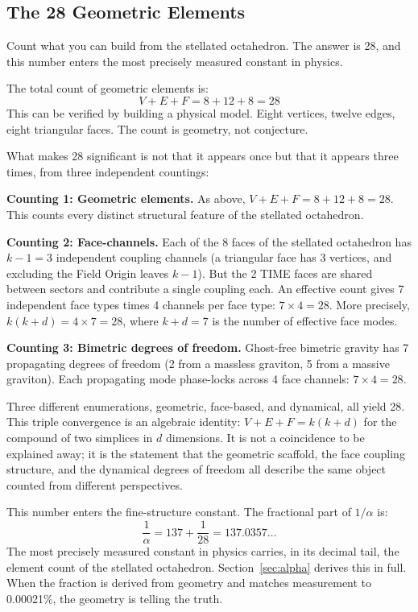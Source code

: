 \documentclass[aps,prd,preprint,superscriptaddress,showpacs,preprintnumbers,amsmath,amssymb,nofootinbib]{revtex4-2}
\begin{document}
\subsection{The 28 Geometric Elements}
\label{subsec:elements}

Count what you can build from the stellated octahedron. The answer is 28, and this number enters the most precisely measured constant in physics.

The total count of geometric elements is:
\begin{equation}
V + E + F = 8 + 12 + 8 = 28
\label{eq:28-elements}
\end{equation}
This can be verified by building a physical model. Eight vertices, twelve edges, eight triangular faces. The count is geometry, not conjecture.

What makes 28 significant is not that it appears once but that it appears three times, from three independent countings:

\textbf{Counting 1: Geometric elements.} As above, $V + E + F = 8 + 12 + 8 = 28$. This counts every distinct structural feature of the stellated octahedron.

\textbf{Counting 2: Face-channels.} Each of the 8 faces of the stellated octahedron has $k - 1 = 3$ independent coupling channels (a triangular face has 3 vertices, and excluding the Field Origin leaves $k - 1$). But the 2 TIME faces are shared between sectors and contribute a single coupling each. An effective count gives 7 independent face types times 4 channels per face type: $7 \times 4 = 28$. More precisely, $k(k+d) = 4 \times 7 = 28$, where $k + d = 7$ is the number of effective face modes.

\textbf{Counting 3: Bimetric degrees of freedom.} Ghost-free bimetric gravity has 7 propagating degrees of freedom (2 from a massless graviton, 5 from a massive graviton). Each propagating mode phase-locks across 4 face channels: $7 \times 4 = 28$.

Three different enumerations, geometric, face-based, and dynamical, all yield 28. This triple convergence is an algebraic identity: $V + E + F = k(k + d)$ for the compound of two simplices in $d$ dimensions. It is not a coincidence to be explained away; it is the statement that the geometric scaffold, the face coupling structure, and the dynamical degrees of freedom all describe the same object counted from different perspectives.

This number enters the fine-structure constant. The fractional part of $1/\alpha$ is:
\begin{equation}
\frac{1}{\alpha} = 137 + \frac{1}{28} = 137.0357\ldots
\label{eq:alpha-preview}
\end{equation}
The most precisely measured constant in physics carries, in its decimal tail, the element count of the stellated octahedron. Section~\ref{sec:alpha} derives this in full. When the fraction is derived from geometry and matches measurement to 0.00021\%, the geometry is telling the truth.
\end{document}
